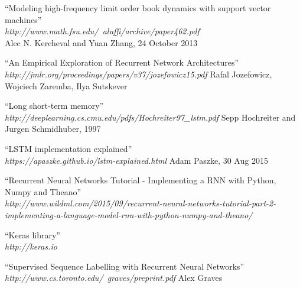\documentclass[twoside]{article}
\begin{document}
\begin{multicols}{2}

\begin{thebibliography}{99}

    ``Modeling high-frequency limit order book dynamics with support vector machines'' \\
\emph{http://www.math.fsu.edu/~aluffi/archive/paper462.pdf} \\
	Alec N. Kercheval and Yuan Zhang, 24 October 2013

	``An Empirical Exploration of Recurrent Network Architectures'' \\
\emph{http://jmlr.org/proceedings/papers/v37/jozefowicz15.pdf}
	Rafal Jozefowicz, Wojciech Zaremba, Ilya Sutskever
	
	``Long short-term memory'' \\
\emph{http://deeplearning.cs.cmu.edu/pdfs/Hochreiter97\_lstm.pdf}
	Sepp Hochreiter and Jurgen Schmidhuber, 1997

    ``LSTM implementation explained'' \\
\emph{https://apaszke.github.io/lstm-explained.html} 
	Adam Paszke, 30 Aug 2015

    ``Recurrent Neural Networks Tutorial - Implementing a RNN with Python, Numpy and Theano'' \\ \emph{http://www.wildml.com/2015/09/recurrent-neural-networks-tutorial-part-2-implementing-a-language-model-rnn-with-python-numpy-and-theano/}

    ``Keras library'' \\
\emph{http://keras.io}

    ``Supervised Sequence Labelling with Recurrent Neural Networks''	\\	\emph{http://www.cs.toronto.edu/~graves/preprint.pdf} 
    Alex Graves

\end{thebibliography}


\end{multicols}
\end{document}
